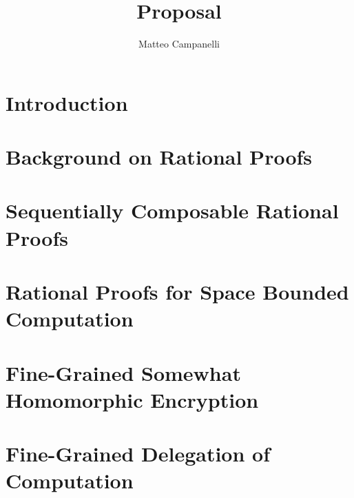 \documentclass[11pt]{article}
\title{Proposal}
\author{Matteo Campanelli}
\date{}
\begin{document}
\maketitle


\tableofcontents





\section{Introduction}



\section{Background on Rational Proofs}



\section{Sequentially Composable Rational Proofs}



\section{Rational Proofs for Space Bounded Computation}


\section{Fine-Grained Somewhat Homomorphic Encryption}


\section{Fine-Grained Delegation of Computation}







\end{document}
